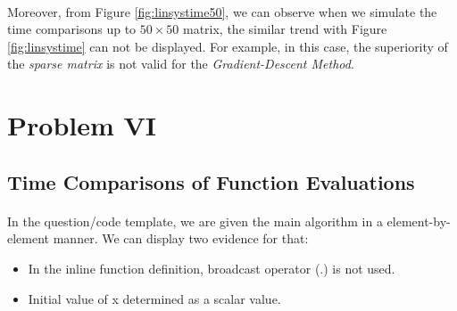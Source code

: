\documentclass[letterpaper,12pt]{article}
\begin{document}
   \paragraph{}Moreover, from Figure \ref{fig:linsystime50}, we can observe when we simulate the time comparisons up to $50\times50$ matrix, the similar trend with Figure \ref{fig:linsystime} can not be displayed. For example, in this case, the superiority of the \textit{sparse matrix} is not valid for the \textit{Gradient-Descent Method}.
   
   
\section{Problem VI}
\subsection{Time Comparisons of Function Evaluations}
\paragraph{} In the question/code template, we are given the main algorithm in a element-by-element manner. We can display two evidence for that:
\begin{itemize}
   \item In the inline function definition, broadcast operator (.) is not used.
   \item Initial value of x determined as a scalar value.
\end{itemize}
\end{document}
